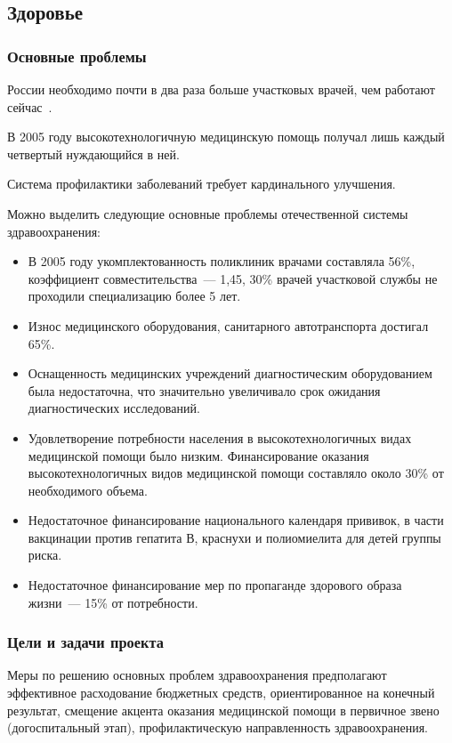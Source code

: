 \documentclass[article, 12pt, russian, oneside]{ncc}
\begin{document}
\subsection{Здоровье}

\subsubsection{Основные проблемы}

России необходимо почти в два раза больше участковых врачей, чем
работают сейчас~\cite{Health_Problems}.

В 2005 году высокотехнологичную медицинскую помощь получал лишь каждый
четвертый нуждающийся в ней.

Система профилактики заболеваний требует кардинального улучшения.

Можно выделить следующие основные проблемы отечественной системы
здравоохранения:

\begin{itemize}
\item В 2005 году укомплектованность поликлиник врачами составляла
  56\%, коэффициент совместительства~--- 1,45, 30\% врачей участковой
  службы не проходили специализацию более 5 лет.
\item Износ медицинского оборудования, санитарного автотранспорта
  достигал 65\%.
\item Оснащенность медицинских учреждений диагностическим
  оборудованием была недостаточна, что значительно увеличивало срок
  ожидания диагностических исследований.
\item Удовлетворение потребности населения в высокотехнологичных видах
  медицинской помощи было низким. Финансирование оказания
  высокотехнологичных видов медицинской помощи составляло около 30\%
  от необходимого объема.
\item Недостаточное финансирование национального календаря прививок, в
  части вакцинации против гепатита В, краснухи и полиомиелита для
  детей группы риска.
\item Недостаточное финансирование мер по пропаганде здорового образа
  жизни~--- 15\% от потребности.
\end{itemize}

\subsubsection{Цели и задачи проекта}

Меры по решению основных проблем здравоохранения предполагают
эффективное расходование бюджетных средств, ориентированное на
конечный результат, смещение акцента оказания медицинской помощи в
первичное звено (догоспитальный этап), профилактическую направленность
здравоохранения.
\end{document}
